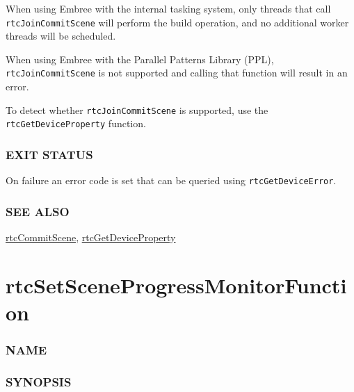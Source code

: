 When using Embree with the internal tasking system, only threads that
call \texttt{rtcJoinCommitScene} will perform the build operation, and
no additional worker threads will be scheduled.

When using Embree with the Parallel Patterns Library (PPL),
\texttt{rtcJoinCommitScene} is not supported and calling that function
will result in an error.

To detect whether \texttt{rtcJoinCommitScene} is supported, use the
\texttt{rtcGetDeviceProperty} function.

\subsubsection{EXIT STATUS}\label{exit-status}

On failure an error code is set that can be queried using
\texttt{rtcGetDeviceError}.

\subsubsection{SEE ALSO}\label{see-also}

\hyperref[rtccommitscene]{rtcCommitScene},
\hyperref[rtcgetdeviceproperty]{rtcGetDeviceProperty}

\pagebreak

\section{rtcSetSceneProgressMonitorFunction}\label{rtcsetsceneprogressmonitorfunction}

\subsubsection{NAME}\label{name}

\begin{Shaded}
\begin{Highlighting}[]
\OperatorTok{{-}}
\end{Highlighting}
\end{Shaded}

\subsubsection{SYNOPSIS}\label{synopsis}

